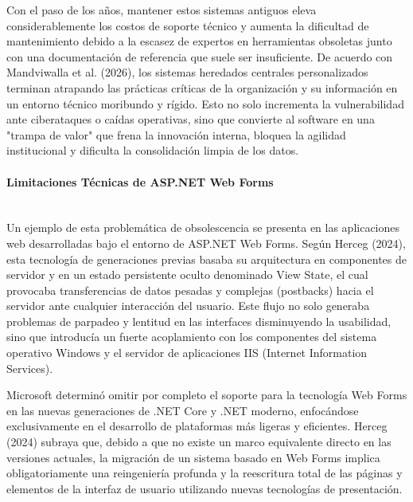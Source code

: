 Con el paso de los años, mantener estos sistemas antiguos eleva considerablemente los costos de soporte técnico y aumenta la dificultad de mantenimiento debido a la escasez de expertos en herramientas obsoletas junto con una documentación de referencia que suele ser insuficiente. De acuerdo con Mandviwalla et al. (2026)\cite{mandviwalla2025modernizing}, los sistemas heredados centrales personalizados terminan atrapando las prácticas críticas de la organización y su información en un entorno técnico moribundo y rígido. Esto no solo incrementa la vulnerabilidad ante ciberataques o caídas operativas, sino que convierte al software en una "trampa de valor" que frena la innovación interna, bloquea la agilidad institucional y dificulta la consolidación limpia de los datos.

\paragraph{Limitaciones Técnicas de ASP.NET Web Forms} ~\\
\label{sec:limitaciones_aspnet}Un ejemplo de esta problemática de obsolescencia se presenta en las aplicaciones web desarrolladas bajo el entorno de ASP.NET Web Forms. Según Herceg (2024)\cite{herceg2024modernizing}, esta tecnología de generaciones previas basaba su arquitectura en componentes de servidor y en un estado persistente oculto denominado View State, el cual provocaba transferencias de datos pesadas y complejas (postbacks) hacia el servidor ante cualquier interacción del usuario. Este flujo no solo generaba problemas de parpadeo y lentitud en las interfaces disminuyendo la usabilidad, sino que introducía un fuerte acoplamiento con los componentes del sistema operativo Windows y el servidor de aplicaciones IIS (Internet Information Services).

Microsoft determinó omitir por completo el soporte para la tecnología Web Forms en las nuevas generaciones de .NET Core y .NET moderno, enfocándose exclusivamente en el desarrollo de plataformas más ligeras y eficientes. Herceg (2024)\cite{herceg2024modernizing} subraya que, debido a que no existe un marco equivalente directo en las versiones actuales, la migración de un sistema basado en Web Forms implica obligatoriamente una reingeniería profunda y la reescritura total de las páginas y elementos de la interfaz de usuario utilizando nuevas tecnologías de presentación.

